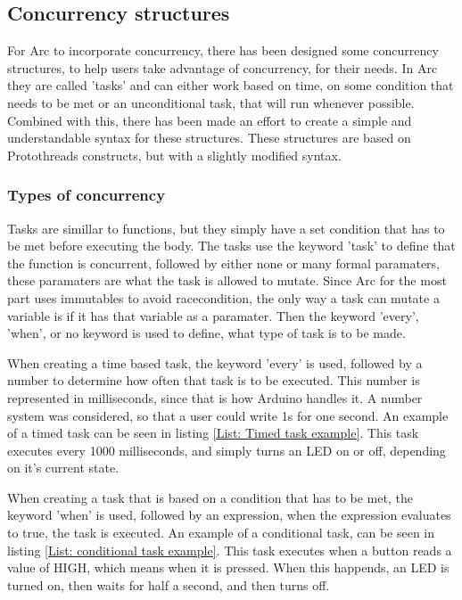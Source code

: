 \subsection{Concurrency structures}\label{sec:concurrency structures}
For Arc to incorporate concurrency, there has been designed some concurrency structures, to help users take advantage of concurrency, for their needs. In Arc they are called 'tasks' and can either work based on time, on some condition that needs to be met or an unconditional task, that will run whenever possible. Combined with this, there has been made an effort to create a simple and understandable syntax for these structures. These structures are based on Protothreads constructs, but with a slightly modified syntax. 


\subsubsection{Types of concurrency}
Tasks are simillar to functions, but they simply have a set condition that has to be met before executing the body. The tasks use the keyword 'task' to define that the function is concurrent, followed by either none or many formal paramaters, these paramaters are what the task is allowed to mutate. Since Arc for the most part uses immutables to avoid racecondition, the only way a task can mutate a variable is if it has that variable as a paramater. Then the keyword 'every', 'when', or no keyword is used to define, what type of task is to be made.

When creating a time based task, the keyword 'every' is used, followed by a number to determine how often that task is to be executed. This number is represented in milliseconds, since that is how Arduino handles it. A number system was considered, so that a user could write 1s for one second.
An example of a timed task can be seen in listing \ref*{List: Timed task example}. This task executes every 1000 milliseconds, and simply turns an LED on or off, depending on it's current state.

When creating a task that is based on a condition that has to be met, the keyword 'when' is used, followed by an expression, when the expression evaluates to true, the task is executed. An example of a conditional task, can be seen in listing \ref*{List: conditional task example}. This task executes when a button reads a value of HIGH, which means when it is pressed. When this happends, an LED is turned on, then waits for half a second, and then turns off.

